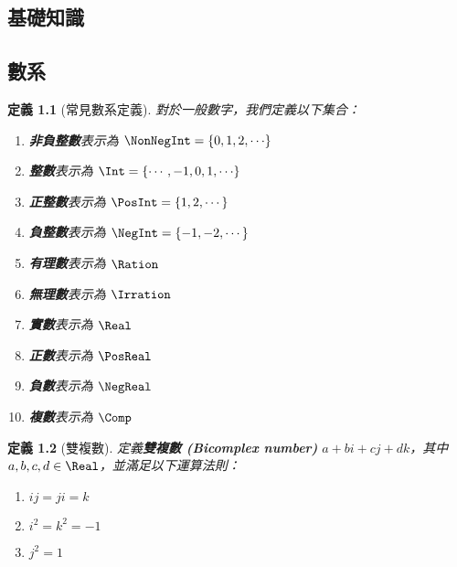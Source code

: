 \documentclass[12pt,a4paper,oneside]{report}
\begin{document}
\begin{CJK}{UTF8}{bkai}
\newtheorem{mydef}{定義}[chapter]
\newtheorem*{mydef*}{定義}
\newtheorem{myrule}[mydef]{原理}
\newtheorem{mythm}[mydef]{定理}
\newtheorem{mypropo}[mydef]{性質}
\newtheorem{mycorol}[mydef]{推論}
\newtheorem{myexample}[mydef]{範例}
\newtheorem*{mynote*}{註}
\renewenvironment{proof}{\textbf{證明}}{\qed}
\newenvironment{mysol}{\textbf{解答}}{\qed}


\fi

\chapter{基礎知識}

\section{數系}

\begin{mydef}[常見數系定義]
\label{def:intro:number_set_notation}
對於一般數字，我們定義以下集合：
\begin{enumerate}
\item \textbf{非負整數}表示為 $\NonNegInt={\{{0,1,2,\cdots}\}}$
\item \textbf{整數}表示為 $\Int={\{{\cdots,-1,0,1,\cdots}\}}$
\item \textbf{正整數}表示為 $\PosInt={\{1,2,\cdots\}}$
\item \textbf{負整數}表示為 $\NegInt={\{-1,-2,\cdots\}}$
\item \textbf{有理數}表示為 $\Ration$
\item \textbf{無理數}表示為 $\Irration$
\item \textbf{實數}表示為 $\Real$
\item \textbf{正數}表示為 $\PosReal$
\item \textbf{負數}表示為 $\NegReal$
\item \textbf{複數}表示為 $\Comp$
\end{enumerate}
\end{mydef}

\begin{mydef}[雙複數]
定義\textbf{雙複數 (Bicomplex number)} $a+bi+cj+dk$，其中 $a,b,c,d\in{\Real}$，並滿足以下運算法則：
\begin{enumerate}
\item $ij=ji=k$
\item $i^2=k^2=-1$
\item $j^2=1$
\end{enumerate}
\end{mydef}


\end{CJK}
\end{document}
